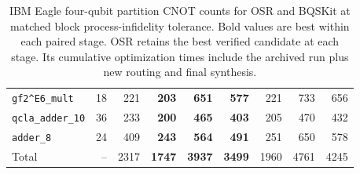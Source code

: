 \begin{table}[p]
\begin{tabular}{lrr|rrr|rrr}
\texttt{gf2\textasciicircum{}E6\_mult} & 18 & 221 & \textbf{203} & \textbf{651} & \textbf{577} & 221 & 733 & 656 \\
\texttt{qcla\_adder\_10} & 36 & 233 & \textbf{200} & \textbf{465} & \textbf{403} & 205 & 470 & 432 \\
\texttt{adder\_8} & 24 & 409 & \textbf{243} & \textbf{564} & \textbf{491} & 251 & 650 & 578 \\
\hline
Total & -- & 2317 & \textbf{1747} & \textbf{3937} & \textbf{3499} & 1960 & 4761 & 4245 \\
\hline
\end{tabular}
\caption{IBM Eagle four-qubit partition CNOT counts for OSR and BQSKit at matched block process-infidelity tolerance. Bold values are best within each paired stage. OSR retains the best verified candidate at each stage. Its cumulative optimization times include the archived run plus new routing and final synthesis.}
\label{tab:osr-bqskit-four-qubit-ibm-eagle-counts}
\end{table}

